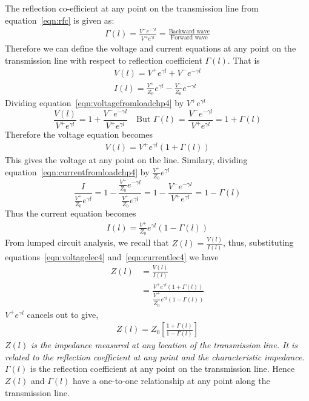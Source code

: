 The reflection co-efficient at any point on the transmission line from equation~\eqref{eqn:rfc} is given as:
\begin{align*}
\Gamma{(l)} = \frac{V^-e^{-\gamma l}}{V^+e^{\gamma l}} = \frac{\text{Backward wave}}{\text{Forward wave}}
\end{align*}
Therefore we can define the voltage and current equations at any point on the transmission line with respect to reflection coefficient $\Gamma(l)$. That is
\begin{align}
V(l) = V^+e^{\gamma l} + V^-e^{-\gamma l}\label{eqn:voltagefromloadchp4}\\
I(l) =\frac{V^+}{Z_0} e^{\gamma l} - \frac{V^-}{Z_0}e^{-\gamma l}\label{eqn:currentfromloadchp4}
\end{align}
Dividing equation~\ref{eqn:voltagefromloadchp4} by $V^+e^{\gamma l}$
\begin{dmath*}
\frac{V(l)}{ V^+e^{\gamma l}} = 1 + \frac{ V^-e^{-\gamma l}}{ V^+e^{\gamma l}}\quad\text{But }\Gamma(l)\text{ = }\frac{ V^-e^{-\gamma l}}{ V^+e^{\gamma l}}
= 1 + \Gamma(l)
\end{dmath*}
Therefore the voltage equation becomes
\begin{align}
V(l) = V^+e^{\gamma l} (1 + \Gamma(l))
\label{eqn:voltagelec4}
\end{align}
This gives the voltage at any point on the line. Similary, dividing equation~\ref{eqn:currentfromloadchp4} by $\frac{V^+}{Z_0} e^{\gamma l}$
\begin{dmath*}
\frac{I}{\frac{V^+}{Z_0} e^{\gamma l}} = 1 - \frac{\frac{V^-}{Z_0} e^{-\gamma l}}{\frac{V^+}{Z_0} e^{\gamma l}}
= 1 - \frac{V^-e^{-\gamma l}}{V^+e^{\gamma l}}
= 1 - \Gamma(l)
\end{dmath*}
Thus the current equation becomes
\begin{align}
I(l) = \frac{V^+}{Z_0} e^{\gamma l} (1 - \Gamma(l))
\label{eqn:currentlec4}
\end{align}
From lumped circuit analysis, we recall that $Z(l) = \frac{V(l)}{I(l)}$, thus, substituting equations~\eqref{eqn:voltagelec4} and~\eqref{eqn:currentlec4} we have
\begin{align*}
Z(l) &= \frac{V(l)}{I(l)}\\
&= \frac{V^+e^{\gamma l} (1 + \Gamma(l))}{ \dfrac{V^+}{Z_0} e^{\gamma l} (1 - \Gamma(l))}
\end{align*}
$V^+ e^{\gamma l}$ cancels out to give,
\begin{align}
Z(l) = Z_0\left[\frac{1 + \Gamma(l)}{1 - \Gamma(l)}\right]
\end{align}
$Z(l)$ \emph{is the impedance measured at any location of the transmission line. It is related to the reflection coefficient at any point and the characteristic impedance}. $\Gamma(l)$ is the reflection coefficient at any point on the transmission line. Hence $Z(l)$ and $\Gamma(l)$ have a one-to-one relationship at any point along the transmission line.


